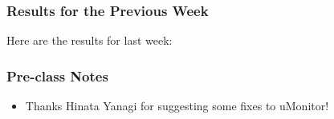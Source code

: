 \begin{frame}
  \frametitle{Results for the Previous Week}

  \begin{center}
    Here are the results for last week:

    \bigskip
    

  \end{center}
\end{frame}

\begin{frame}[fragile]
  \frametitle{Pre-class Notes}

  \begin{itemize}
  \item Thanks Hinata Yanagi for suggesting some fixes to uMonitor!
  \end{itemize}
  
\end{frame}

